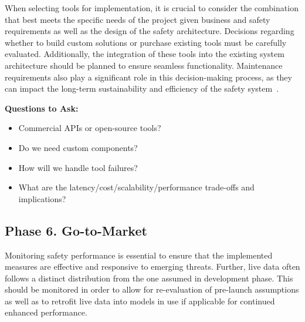 When selecting tools for implementation, it is crucial to consider the combination that best meets the specific needs of the project given business and safety requirements as well as the design of the safety architecture. Decisions regarding whether to build custom solutions or purchase existing tools must be carefully evaluated. Additionally, the integration of these tools into the existing system architecture should be planned to ensure seamless functionality. Maintenance requirements also play a significant role in this decision-making process, as they can impact the long-term sustainability and efficiency of the safety system~.

\textbf{Questions to Ask:}
\begin{itemize}
    \item Commercial APIs or open-source tools?
    \item Do we need custom components?
    \item How will we handle tool failures?
    \item What are the latency/cost/scalability/performance trade-offs and implications?
\end{itemize}

\subsection{Phase 6. Go-to-Market}

Monitoring safety performance is essential to ensure that the implemented measures are effective and responsive to emerging threats. Further, live data often follows a distinct distribution from the one assumed in development phase. This should be monitored in order to allow for re-evaluation of pre-launch assumptions as well as to retrofit live data into models in use if applicable for continued enhanced performance.

